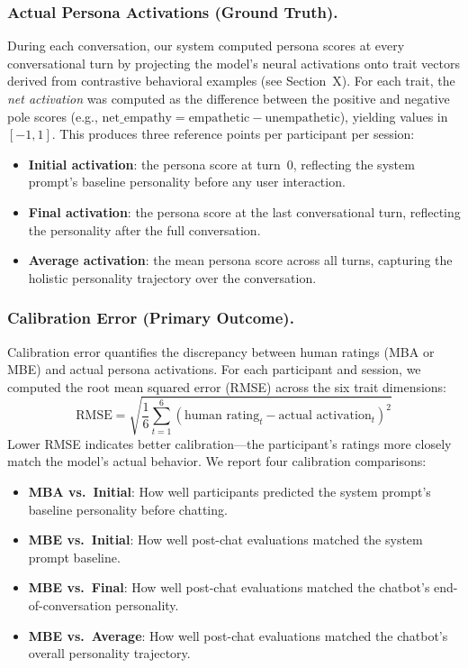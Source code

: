 \subsubsection{Actual Persona Activations (Ground Truth).}
During each conversation, our system computed persona scores at every
conversational turn by projecting the model's neural activations onto
trait vectors derived from contrastive behavioral examples
(see Section~X). For each trait, the \emph{net activation} was computed
as the difference between the positive and negative pole scores
(e.g., $\text{net\_empathy} = \text{empathetic} - \text{unempathetic}$),
yielding values in $[-1, 1]$. This produces three reference points per
participant per session:
\begin{itemize}
    \item \textbf{Initial activation}: the persona score at turn~0,
    reflecting the system prompt's baseline personality before any
    user interaction.
    \item \textbf{Final activation}: the persona score at the last
    conversational turn, reflecting the personality after the full
    conversation.
    \item \textbf{Average activation}: the mean persona score across all
    turns, capturing the holistic personality trajectory over the
    conversation.
\end{itemize}

\subsubsection{Calibration Error (Primary Outcome).}
Calibration error quantifies the discrepancy between human ratings
(MBA or MBE) and actual persona activations. For each participant and
session, we computed the root mean squared error (RMSE) across the six
trait dimensions:
\[
    \text{RMSE} = \sqrt{\frac{1}{6} \sum_{t=1}^{6}
    (\text{human rating}_t - \text{actual activation}_t)^2}
\]
Lower RMSE indicates better calibration---the participant's ratings
more closely match the model's actual behavior. We report four
calibration comparisons:
\begin{itemize}
    \item \textbf{MBA vs.\ Initial}: How well participants predicted
    the system prompt's baseline personality before chatting.
    \item \textbf{MBE vs.\ Initial}: How well post-chat evaluations
    matched the system prompt baseline.
    \item \textbf{MBE vs.\ Final}: How well post-chat evaluations
    matched the chatbot's end-of-conversation personality.
    \item \textbf{MBE vs.\ Average}: How well post-chat evaluations
    matched the chatbot's overall personality trajectory.
\end{itemize}

